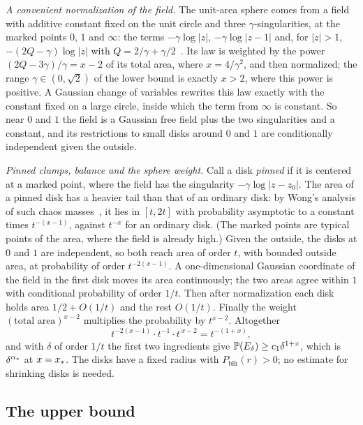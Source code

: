 \emph{A convenient normalization of the field.} The unit-area sphere comes from a field with additive
constant fixed on the unit circle and three $\gamma$-singularities, at the marked points $0$, $1$
and $\infty$: the terms $-\gamma\log|z|$, $-\gamma\log|z-1|$ and, for $|z|>1$, $-(2Q-\gamma)\log|z|$
with $Q=2/\gamma+\gamma/2$~\cite[Definition~2.2]{BGS}. Its law is weighted by the power
$(2Q-3\gamma)/\gamma=x-2$ of its total area, where $x=4/\gamma^2$, and then normalized; the range
$\gamma\in(0,\sqrt2)$ of the lower bound is exactly $x>2$, where this power is positive. A Gaussian
change of variables rewrites this law exactly with the constant fixed on a large circle, inside
which the term from $\infty$ is constant. So near $0$ and $1$ the field is a Gaussian free field
plus the two singularities and a constant, and its restrictions to small disks around $0$ and $1$
are conditionally independent given the outside.

\emph{Pinned clumps, balance and the sphere weight.} Call a disk \emph{pinned} if it is centered at
a marked point, where the field has the singularity $-\gamma\log|z-z_0|$. The area of a pinned disk
has a heavier tail than that of an ordinary disk: by Wong's analysis of such chaos
masses~\cite{Wong}, it lies in $[t,2t]$ with probability asymptotic to a constant times
$t^{-(x-1)}$, against $t^{-x}$ for an ordinary disk. (The marked points are typical points of the
area, where the field is already high.) Given the outside, the disks at $0$ and $1$ are independent,
so both reach area of order $t$, with bounded outside area, at probability of order $t^{-2(x-1)}$. A
one-dimensional Gaussian coordinate of the field in the first disk moves its area continuously; the
two areas agree within $1$ with conditional probability of order $1/t$. Then after normalization
each disk holds area $1/2+O(1/t)$ and the rest $O(1/t)$. Finally the weight $(\text{total
area})^{x-2}$ multiplies the probability by $t^{x-2}$. Altogether
\[
t^{-2(x-1)}\cdot t^{-1}\cdot t^{\,x-2}=t^{-(1+x)} ,
\]
and with $\delta$ of order $1/t$ the first two ingredients give $\mathbb{P}(E_\delta)\ge c_1\delta^{1+x}$,
which is $\delta^{\alpha_*}$ at $x=x_*$. The disks have a fixed radius with $P_{\mathrm{blk}}(r)>0$; no estimate
for shrinking disks is needed.

\subsection{The upper bound}

